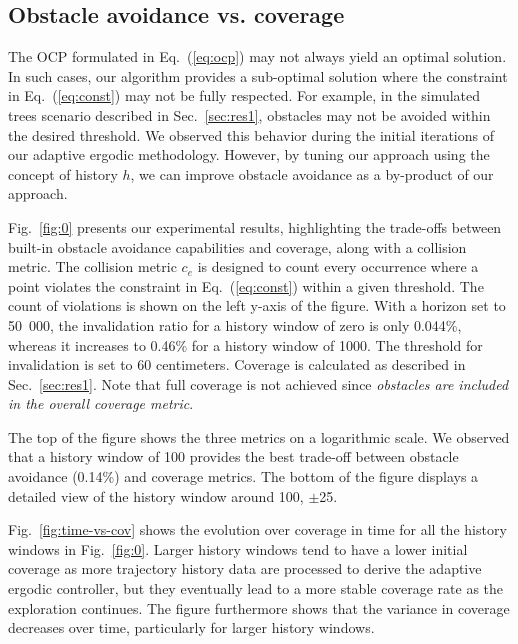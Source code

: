 \documentclass[letterpaper, 10 pt, conference, twoside]{IEEEtran}
\theoremstyle{definition}
\begin{document}
\subsection{Obstacle avoidance vs. coverage}\label{sec:res2}
\noindent
The OCP formulated in Eq.~(\ref{eq:ocp}) may not always yield an optimal solution. In such cases, our algorithm provides a sub-optimal solution where the constraint in Eq.~(\ref{eq:const}) may not be fully respected. For example, in the simulated trees scenario described in Sec.~\ref{sec:res1}, obstacles may not be avoided within the desired threshold. We observed this behavior during the initial iterations of our adaptive ergodic methodology. However, by tuning our approach using the concept of history $h$, we can improve obstacle avoidance as a by-product of our approach.

Fig.~\ref{fig:0} presents our experimental results, highlighting the trade-offs between built-in obstacle avoidance capabilities and coverage, along with a collision metric. The collision metric $c_e$ is designed to count every occurrence where a point violates the constraint in Eq.~(\ref{eq:const}) within a given threshold. The count of violations is shown on the left y-axis of the figure. With a horizon set to 50~000, the invalidation ratio for a history window of zero is only 0.044\%, whereas it increases to 0.46\% for a history window of 1000. The threshold for invalidation is set to 60 centimeters. Coverage is calculated as described in Sec.~\ref{sec:res1}. Note that full coverage is not achieved since \textit{obstacles are included in the overall coverage metric}.

The top of the figure shows the three metrics on a logarithmic scale. We observed that a history window of 100 provides the best trade-off between obstacle avoidance (0.14\%) and coverage metrics. The bottom of the figure displays a detailed view of the history window around 100, $\pm$25.

Fig.~\ref{fig:time-vs-cov} shows the evolution over coverage in time for all the history windows in Fig.~\ref{fig:0}. Larger history windows tend to have a lower initial coverage as more trajectory history data are processed to derive the adaptive ergodic controller, but they eventually lead to a more stable coverage rate as the exploration continues. The figure furthermore shows that the variance in coverage decreases over time, particularly for larger history windows.%
\end{document}
